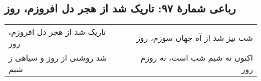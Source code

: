 \begin{center}
\section*{رباعی شمارهٔ ۹۷: تاریک شد از هجر دل افروزم، روز}
\label{sec:097}
\begin{longtable}{l p{0.5cm} r}
تاریک شد از هجر دل افروزم، روز
&&
شب نیز شد از آه جهان سوزم، روز
\\
شد روشنی از روز و سیاهی ز شبم
&&
اکنون نه شبم شب است، نه روزم روز
\\
\end{longtable}
\end{center}
